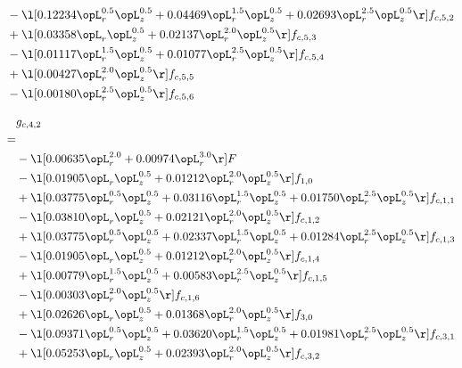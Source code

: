 \begin{alignat}{2}
& - \l[  0.12234 \opL_r^{0.5} \opL_z^{0.5} +  0.04469 \opL_r^{1.5} \opL_z^{0.5} +  0.02693 \opL_r^{2.5} \opL_z^{0.5}  \r] f_{c,5,2} \nonumber \\ 
& + \l[  0.03358 \opL_r \opL_z^{0.5} +  0.02137 \opL_r^{2.0} \opL_z^{0.5}  \r] f_{c,5,3} \nonumber \\ 
& - \l[  0.01117 \opL_r^{1.5} \opL_z^{0.5} +  0.01077 \opL_r^{2.5} \opL_z^{0.5}  \r] f_{c,5,4} \nonumber \\ 
& + \l[  0.00427 \opL_r^{2.0} \opL_z^{0.5}  \r] f_{c,5,5} \nonumber \\ 
& - \l[  0.00180 \opL_r^{2.5} \opL_z^{0.5}  \r] f_{c,5,6} \nonumber \\ 
\end{alignat} 


\begin{alignat}{2} 
\label{eq:g_42_0} 
& g_{c,4,2} \nonumber \\ 
 = \\ 
& - \l[  0.00635 \opL_r^{2.0} +  0.00974 \opL_r^{3.0}  \r] F \nonumber \\ 
& - \l[  0.01905 \opL_r \opL_z^{0.5} +  0.01212 \opL_r^{2.0} \opL_z^{0.5}  \r] f_{1,0} \nonumber \\ 
& + \l[  0.03775 \opL_r^{0.5} \opL_z^{0.5} +  0.03116 \opL_r^{1.5} \opL_z^{0.5} +  0.01750 \opL_r^{2.5} \opL_z^{0.5}  \r] f_{c,1,1} \nonumber \\ 
& - \l[  0.03810 \opL_r \opL_z^{0.5} +  0.02121 \opL_r^{2.0} \opL_z^{0.5}  \r] f_{c,1,2} \nonumber \\ 
& + \l[  0.03775 \opL_r^{0.5} \opL_z^{0.5} +  0.02337 \opL_r^{1.5} \opL_z^{0.5} +  0.01284 \opL_r^{2.5} \opL_z^{0.5}  \r] f_{c,1,3} \nonumber \\ 
& - \l[  0.01905 \opL_r \opL_z^{0.5} +  0.01212 \opL_r^{2.0} \opL_z^{0.5}  \r] f_{c,1,4} \nonumber \\ 
& + \l[  0.00779 \opL_r^{1.5} \opL_z^{0.5} +  0.00583 \opL_r^{2.5} \opL_z^{0.5}  \r] f_{c,1,5} \nonumber \\ 
& - \l[  0.00303 \opL_r^{2.0} \opL_z^{0.5}  \r] f_{c,1,6} \nonumber \\ 
& + \l[  0.02626 \opL_r \opL_z^{0.5} +  0.01368 \opL_r^{2.0} \opL_z^{0.5}  \r] f_{3,0} \nonumber \\ 
& - \l[  0.09371 \opL_r^{0.5} \opL_z^{0.5} +  0.03620 \opL_r^{1.5} \opL_z^{0.5} +  0.01981 \opL_r^{2.5} \opL_z^{0.5}  \r] f_{c,3,1} \nonumber \\ 
& + \l[  0.05253 \opL_r \opL_z^{0.5} +  0.02393 \opL_r^{2.0} \opL_z^{0.5}  \r] f_{c,3,2} \nonumber \\ 

\end{alignat}
